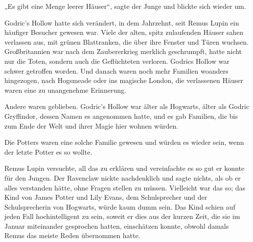 „Es gibt eine Menge leerer Häuser“, sagte der Junge und blickte sich wieder um.

Godric’s Hollow hatte sich verändert, in dem Jahrzehnt, seit Remus Lupin ein häufiger Besucher gewesen war. Viele der alten, spitz zulaufenden Häuser sahen verlassen aus, mit grünen Blattranken, die über ihre Fenster und Türen wuchsen. Großbritannien war nach dem Zaubererkrieg merklich geschrumpft, hatte nicht nur die Toten, sondern auch die Geflüchteten verloren. Godrics Hollow war schwer getroffen worden. Und danach waren noch mehr Familien woanders hingezogen, nach Hogsmeade oder ins magische London, die verlassenen Häuser waren eine zu unangenehme Erinnerung.

Andere waren geblieben. Godric’s Hollow war älter als Hogwarts, älter als Godric Gryffindor, dessen Namen es angenommen hatte, und es gab Familien, die bis zum Ende der Welt und ihrer Magie hier wohnen würden.

Die Potters waren eine solche Familie gewesen und würden es wieder sein, wenn der letzte Potter es so wollte.

Remus Lupin versuchte, all das zu erklären und vereinfachte es so gut er konnte für den Jungen. Der Ravenclaw nickte nachdenklich und sagte nichts, als ob er alles verstanden hätte, ohne Fragen stellen zu müssen. Vielleicht war das so; das Kind von James Potter und Lily Evans, dem Schulsprecher und der Schulsprecherin von Hogwarts, würde kaum dumm sein. Das Kind schien auf jeden Fall hochintelligent zu sein, soweit er dies aus der kurzen Zeit, die sie im Januar miteinander gesprochen hatten, einschätzen konnte, obwohl damals Remus das meiste Reden übernommen hatte.

